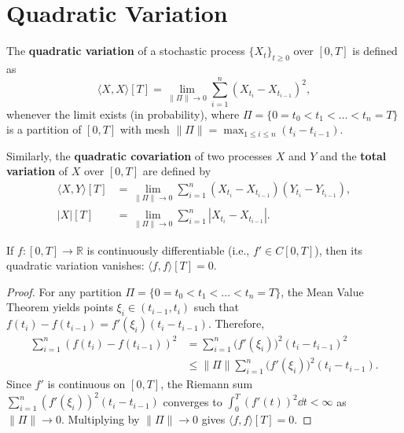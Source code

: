 \section{Quadratic Variation}

\begin{definition}
\label{def:quadratic-variation}
The \textbf{quadratic variation} of a stochastic process $\{X_t\}_{t \ge 0}$ over $[0, T]$ is defined as
\[
\langle X, X \rangle[T] = \lim_{\|\Pi\| \to 0} \sum_{i=1}^{n} \left(X_{t_i} - X_{t_{i-1}}\right)^2,
\]
whenever the limit exists (in probability), where $\Pi = \{0 = t_0 < t_1 < \dots < t_n = T\}$ is a partition of $[0, T]$ with mesh $\|\Pi\| = \max_{1 \le i \le n} (t_i - t_{i-1})$.
\end{definition}

\begin{note}
\label{note:covariation}
Similarly, the \textbf{quadratic covariation} of two processes $X$ and $Y$ and the \textbf{total variation} of $X$ over $[0, T]$ are defined by
\begin{align*}
\langle X, Y \rangle[T] &= \lim_{\|\Pi\| \to 0} \sum_{i=1}^{n} \left(X_{t_i} - X_{t_{i-1}}\right)\left(Y_{t_i} - Y_{t_{i-1}}\right), \\
|X|[T] &= \lim_{\|\Pi\| \to 0} \sum_{i=1}^{n} \left|X_{t_i} - X_{t_{i-1}}\right|.
\end{align*}
\end{note}

\begin{proposition}
\label{prop:smooth-qv}
If $f : [0, T] \to \mathbb{R}$ is continuously differentiable (i.e., $f' \in C[0, T]$), then its quadratic variation vanishes: $\langle f, f \rangle[T] = 0$.
\end{proposition}
\begin{proof}
For any partition $\Pi = \{0 = t_0 < t_1 < \dots < t_n = T\}$, the Mean Value Theorem yields points $\xi_i \in (t_{i-1}, t_i)$ such that $f(t_i) - f(t_{i-1}) = f'(\xi_i)(t_i - t_{i-1})$. Therefore,
\begin{align*}
\sum_{i=1}^{n} \left(f(t_i) - f(t_{i-1})\right)^2
&= \sum_{i=1}^{n} \big(f'(\xi_i)\big)^2 (t_i - t_{i-1})^2 \\
&\le \|\Pi\| \sum_{i=1}^{n} \big(f'(\xi_i)\big)^2 (t_i - t_{i-1}).
\end{align*}
Since $f'$ is continuous on $[0, T]$, the Riemann sum $\sum_{i=1}^n (f'(\xi_i))^2 (t_i - t_{i-1})$ converges to $\int_0^T (f'(t))^2 \dd t < \infty$ as $\|\Pi\| \to 0$. Multiplying by $\|\Pi\| \to 0$ gives $\langle f, f \rangle[T] = 0$.
\end{proof}

